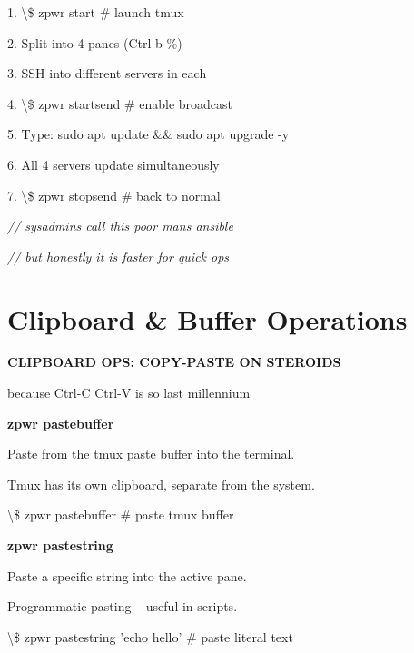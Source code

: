 \documentclass[11pt,a4paper,twoside]{book}
\begin{document}
1. \textbackslash{}\$ zpwr start                   \# launch tmux

2. Split into 4 panes (Ctrl-b \%)

3. SSH into different servers in each

4. \textbackslash{}\$ zpwr startsend               \# enable broadcast

5. Type: sudo apt update \&\& sudo apt upgrade -y

6. All 4 servers update simultaneously

7. \textbackslash{}\$ zpwr stopsend                \# back to normal

{\small\itshape\color{dimtext} // sysadmins call this poor mans ansible}

{\small\itshape\color{dimtext} // but honestly it is faster for quick ops}


\vspace{16pt}

\section{Clipboard \& Buffer Operations}


\vspace{10pt}
{\large\bfseries\color{neoncyan} CLIPBOARD OPS: COPY-PASTE ON STEROIDS}\vspace{6pt}

because Ctrl-C Ctrl-V is so last millennium


\vspace{12pt}
{\bfseries\color{neonyellow} zpwr pastebuffer}\vspace{4pt}

Paste from the tmux paste buffer into the terminal.

Tmux has its own clipboard, separate from the system.

\begin{codebox}
\textbackslash{}\$ zpwr pastebuffer            \# paste tmux buffer\\
\end{codebox}


\vspace{12pt}
{\bfseries\color{neonyellow} zpwr pastestring}\vspace{4pt}

Paste a specific string into the active pane.

Programmatic pasting -- useful in scripts.

\begin{codebox}
\textbackslash{}\$ zpwr pastestring 'echo hello' \# paste literal text\\
\end{codebox}
\end{document}
